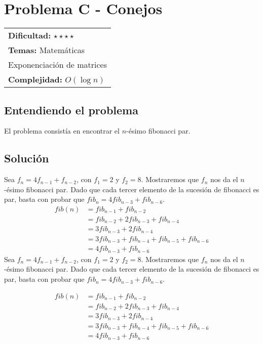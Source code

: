 \section{Problema C - Conejos}

\hfill
\begin{tabular}{@{}l@{}}
\textbf{Dificultad:} $\star \star \star \star$ \\
\textbf{Temas:} Matemáticas \\ Exponenciación de matrices \\
\textbf{Complejidad:} $O(\log n)$
\end{tabular}

\subsection*{Entendiendo el problema}
El problema consistía en encontrar el $n$-ésimo fibonacci par. 

\subsection*{Solución}
Sea $f_n = 4f_{n-1} + f_{n-2}$, con $f_1 = 2$ y $f_2 = 8$. Mostraremos que $f_n$ nos da el $n$-ésimo fibonacci par. Dado que cada tercer elemento de la sucesión de fibonacci es par, basta con probar que $fib_n = 4fib_{n-3} + fib_{n-6}$.
\begin{align*}
fib(n) & = fib_{n-1} + fib_{n-2} \\
       & = fib_{n-2} + 2fib_{n-3} + fib_{n-4} \\
       & = 3fib_{n-3} + 2fib_{n-4} \\
       & = 3fib_{n-3} + fib_{n-4} + fib_{n-5} + fib_{n-6} \\
       & = 4fib_{n-3} + fib_{n-6}
\end{align*}
Sea $f_n = 4f_{n-1} + f_{n-2}$, con $f_1 = 2$ y $f_2 = 8$. Mostraremos que $f_n$ nos da el $n$-ésimo fibonacci par. Dado que cada tercer elemento de la sucesión de fibonacci es par, basta con probar que $fib_n = 4fib_{n-3} + fib_{n-6}$.

\begin{align*}
fib(n) & = fib_{n-1} + fib_{n-2} \\
       & = fib_{n-2} + 2fib_{n-3} + fib_{n-4} \\
       & = 3fib_{n-3} + 2fib_{n-4} \\
       & = 3fib_{n-3} + fib_{n-4} + fib_{n-5} + fib_{n-6} \\
       & = 4fib_{n-3} + fib_{n-6}
\end{align*} 


